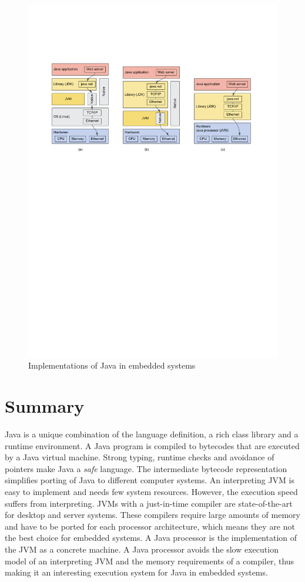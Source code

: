 \begin{figure}
    \centering
    \includegraphics{visio/jvmall}
    \caption{Implementations of Java in embedded systems}\label{fig:java:embedded}
\end{figure}



\section{Summary}

Java is a unique combination of the language definition, a rich
class library and a runtime environment. A Java program is compiled
to bytecodes that are executed by a Java virtual machine. Strong
typing, runtime checks and avoidance of pointers make Java a
\emph{safe} language. The intermediate bytecode representation
simplifies porting of Java to different computer systems. An
interpreting JVM is easy to implement and needs few system
resources. However, the execution speed suffers from interpreting.
JVMs with a just-in-time compiler are state-of-the-art for desktop
and server systems. These compilers require large amounts of memory
and have to be ported for each processor architecture, which means
they are not the best choice for embedded systems. A Java processor
is the implementation of the JVM as a concrete machine. A Java
processor avoids the slow execution model of an interpreting JVM and
the memory requirements of a compiler, thus making it an interesting
execution system for Java in embedded systems.
